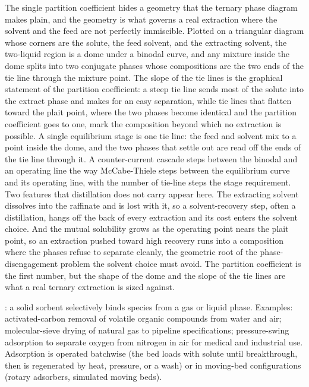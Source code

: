 The single partition coefficient hides a geometry that the ternary phase
diagram makes plain, and the geometry is what governs a real extraction where
the solvent and the feed are not perfectly immiscible. Plotted on a triangular
diagram whose corners are the solute, the feed solvent, and the extracting
solvent, the two-liquid region is a dome under a binodal curve, and any mixture
inside the dome splits into two conjugate phases whose compositions are the two
ends of the tie line through the mixture point. The slope of the tie lines is
the graphical statement of the partition coefficient: a steep tie line sends
most of the solute into the extract phase and makes for an easy separation,
while tie lines that flatten toward the plait point, where the two phases
become identical and the partition coefficient goes to one, mark the
composition beyond which no extraction is possible. A single equilibrium stage
is one tie line: the feed and solvent mix to a point inside the dome, and the
two phases that settle out are read off the ends of the tie line through it. A
counter-current cascade steps between the binodal and an operating line the way
McCabe-Thiele steps between the equilibrium curve and its operating line, with
the number of tie-line steps the stage requirement. Two features that
distillation does not carry appear here. The extracting solvent dissolves into
the raffinate and is lost with it, so a solvent-recovery step, often a
distillation, hangs off the back of every extraction and its cost enters the
solvent choice. And the mutual solubility grows as the operating point nears
the plait point, so an extraction pushed toward high recovery runs into a
composition where the phases refuse to separate cleanly, the geometric root of
the phase-disengagement problem the solvent choice must avoid. The partition
coefficient is the first number, but the shape of the dome and the slope of the
tie lines are what a real ternary extraction is sized against.

: a solid sorbent selectively binds species from
a gas or liquid phase. Examples: activated-carbon removal of
volatile organic compounds from water and air; molecular-sieve
drying of natural gas to pipeline specifications; pressure-swing
adsorption to separate oxygen from nitrogen in air for medical and
industrial use. Adsorption is operated batchwise (the bed loads
with solute until breakthrough, then is regenerated by heat,
pressure, or a wash) or in moving-bed configurations (rotary
adsorbers, simulated moving beds).

